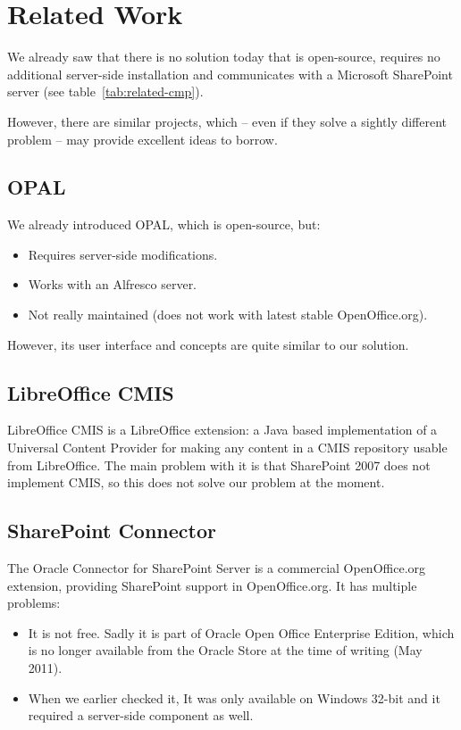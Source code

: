 \section{Related Work}

We already saw that there is no solution today that is open-source, requires no
additional server-side installation and communicates with a Microsoft
SharePoint server (see table~\ref{tab:related-cmp}).

However, there are similar projects, which -- even if they
solve a sightly different problem -- may provide excellent ideas to borrow.

\subsection*{OPAL}
We already introduced OPAL, which is open-source, but:

\begin{itemize}
\item Requires server-side modifications.
\item Works with an Alfresco server.
\item Not really maintained (does not work with latest stable OpenOffice.org).
\end{itemize}

However, its user interface and concepts are quite similar to our solution.

\subsection*{LibreOffice CMIS}
LibreOffice CMIS\cite{locmis} is a LibreOffice extension: a Java based
implementation of a Universal Content Provider for making any content in a CMIS
repository usable from LibreOffice. The main problem with it is that SharePoint
2007 does not implement CMIS, so this does not solve our problem at the moment.

\subsection*{SharePoint Connector}
The Oracle Connector for SharePoint Server\cite{oracle-sp-connector} is a
commercial OpenOffice.org extension, providing SharePoint support in
OpenOffice.org. It has multiple problems:

\begin{itemize}
\item It is not free. Sadly it is part of Oracle Open Office Enterprise
Edition, which is no longer available from the Oracle Store at the time of
writing (May 2011).
\item When we earlier checked it, It was only available on Windows 32-bit and it
required a server-side component as well.
\end{itemize}

